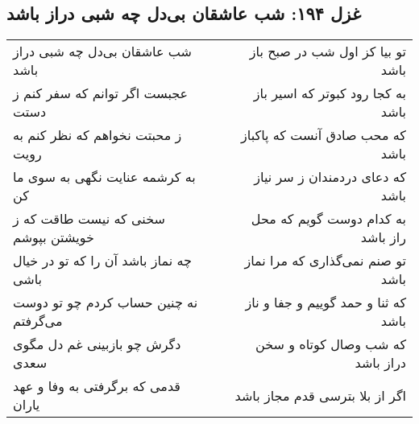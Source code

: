 \begin{center}
\section*{غزل ۱۹۴: شب عاشقان بی‌دل چه شبی دراز باشد}
\label{sec:194}
\begin{longtable}{l p{0.5cm} r}
شب عاشقان بی‌دل چه شبی دراز باشد
&&
تو بیا کز اول شب در صبح باز باشد
\\
عجبست اگر توانم که سفر کنم ز دستت
&&
به کجا رود کبوتر که اسیر باز باشد
\\
ز محبتت نخواهم که نظر کنم به رویت
&&
که محب صادق آنست که پاکباز باشد
\\
به کرشمه عنایت نگهی به سوی ما کن
&&
که دعای دردمندان ز سر نیاز باشد
\\
سخنی که نیست طاقت که ز خویشتن بپوشم
&&
به کدام دوست گویم که محل راز باشد
\\
چه نماز باشد آن را که تو در خیال باشی
&&
تو صنم نمی‌گذاری که مرا نماز باشد
\\
نه چنین حساب کردم چو تو دوست می‌گرفتم
&&
که ثنا و حمد گوییم و جفا و ناز باشد
\\
دگرش چو بازبینی غم دل مگوی سعدی
&&
که شب وصال کوتاه و سخن دراز باشد
\\
قدمی که برگرفتی به وفا و عهد یاران
&&
اگر از بلا بترسی قدم مجاز باشد
\\
\end{longtable}
\end{center}
